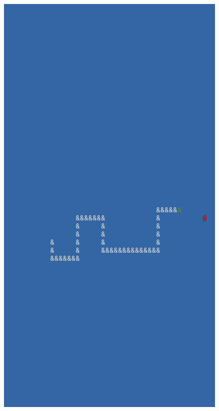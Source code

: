 \documentclass{beamer}
\begin{document}
\begin{frame}
\begin{columns}
\begin{column}{0.35\textwidth}
\begin{figure}
				\includegraphics[width=\textwidth]{Presentation/snake.png}
			\end{figure}
		\end{column}
	\end{columns}
\end{frame}
\end{document}
